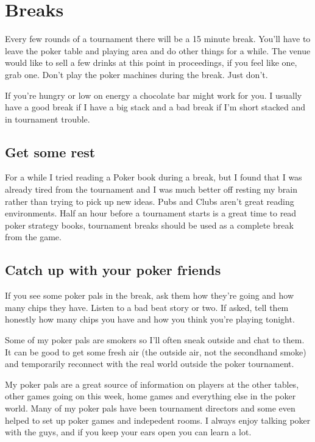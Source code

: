 \chapter{Breaks}


Every few rounds of a tournament there will be a 15 minute break.
You'll have to leave the poker table and playing area
and do other things for a while. The venue would like to sell
a few drinks at this point in proceedings, if you feel like one, grab one.
Don't play the poker machines during the break. Just don't.

If you're hungry or low on energy a chocolate bar might work
for you. I usually have a good break if I have a big stack
and a bad break if I'm short stacked and in tournament trouble.

\section*{Get some rest}

For a while I tried reading a Poker book during a break, but I
found that I was already tired from the tournament and I was much better
off resting my brain rather than trying to pick up new ideas.
Pubs and Clubs aren't great reading environments. Half an hour before a
tournament starts is a great time to read poker strategy books,
tournament breaks should be used as a complete break from the game.

\section*{Catch up with your poker friends}

If you see some poker pals in the break, ask them how they're
going and how many chips they have. Listen to a bad beat story
or two. If asked, tell them honestly how
many chips you have and how you think you're playing tonight.

Some of my poker pals are smokers so I'll often sneak outside and
chat to them. It can be good to get some fresh air (the outside
air, not the secondhand smoke) and temporarily reconnect with
the real world outside the poker tournament.

My poker pals are a great source of information on players
at the other tables, other games going on this week, home games
and everything else in the poker world. Many of my poker pals
have been tournament directors and some even helped to set up
poker games and indepedent rooms. I always
enjoy talking poker with the guys, and if you keep your ears open
you can learn a lot.


